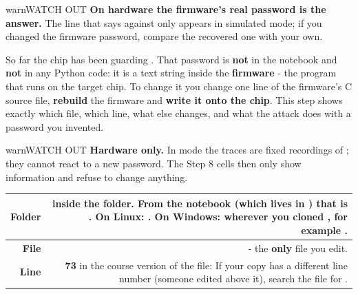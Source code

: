 \documentclass[11pt,letterpaper]{article}
\begin{document}
\begin{guidecallout}{warn}{WATCH OUT}
\textbf{On hardware the firmware's real password is the answer.} The line that says  against 
only appears in simulated mode; if you changed the firmware password, compare the recovered one with your own.
\end{guidecallout}

\Needspace{173pt}

\clearpage


So far the chip has been guarding . That password is \textbf{not} in the notebook and \textbf{not} in any
Python code: it is a text string inside the \textbf{firmware} - the program that runs on the target chip. To change it
you change one line of the firmware's C source file, \textbf{rebuild} the firmware and \textbf{write it onto the
chip}. This step shows exactly which file, which line, what else changes, and what the attack does with a password you
invented.

\begin{guidecallout}{warn}{WATCH OUT}
\textbf{Hardware only.} In  mode the traces are fixed recordings of ; they cannot react
to a new password. The Step 8 cells then only show information and refuse to change anything.
\end{guidecallout}


{\small{}
\begin{longtable}{|R{0.1304}|R{0.8696}|}
\hline
\textbf{Folder} &  inside the  folder. From the notebook (which lives in ) that is . On Linux: . On Windows: wherever you cloned , for example . \\ \hline
\textbf{File} &  - the \textbf{only} file you edit. \\ \hline
\textbf{Line} & \textbf{73} in the course version of the file:   If your copy has a different line number (someone edited above it), search the file for . \\ \hline
\end{longtable}}
\end{document}
